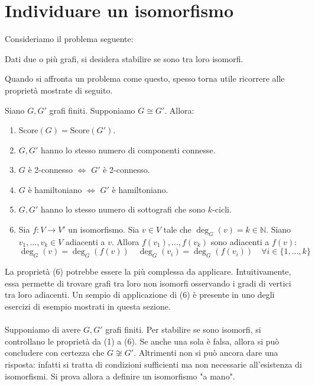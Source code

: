 

\section{Individuare un isomorfismo}
Consideriamo il problema seguente:
\begin{center}
Dati due o più grafi, si desidera stabilire se sono tra loro isomorfi.
\end{center}
Quando si affronta un problema come questo, spesso torna utile ricorrere
alle proprietà mostrate di seguito.
\begin{tcolorbox}[colback=red!30, colframe=red!30!black, title=Alcune caratteristiche dei grafi isomorfi]
Siano $G,G'$ grafi finiti. Supponiamo $G\cong G'$. Allora:
\begin{enumerate}
\item $\text{Score}(G)=\text{Score}(G')$.
\item $G,G'$ hanno lo stesso numero di componenti connesse.
\item $G$ è 2-connesso $\Longleftrightarrow$ $G'$ è 2-connesso.
\item $G$ è hamiltoniano $\Longleftrightarrow$ $G'$ è hamiltoniano.
\item $G,G'$ hanno lo stesso numero di sottografi che sono $k$-cicli.
\item Sia $f:V\to V'$ un isomorfismo. Sia $v\in V$ tale che $\deg_G(v)=k\in\mathbb{N}$.
Siano $v_1,...,v_k \in V$ adiacenti a $v$. Allora $f(v_1),...,f(v_k)$ sono
adiacenti a $f(v)$: \[\deg_G(v)=\deg_G(f(v)) \quad \deg_G(v_i)=\deg_G(f(v_i)) \quad \forall i \in\{1,...,k\}\]
\end{enumerate}
\end{tcolorbox}

La proprietà (6) potrebbe essere la più complessa da applicare. Intuitivamente,
essa permette di trovare grafi tra loro non isomorfi osservando i gradi
di vertici tra loro adiacenti. Un sempio di applicazione di (6) è presente
in uno degli esercizi di esempio mostrati in questa sezione.
\\\\
Supponiamo di avere $G,G'$ grafi finiti. Per stabilire se sono isomorfi, si
controllano le proprietà da (1) a (6). Se anche una sola è falsa, allora
si può concludere con certezza che $G\not\cong G'$. Altrimenti non si può
ancora dare una risposta: infatti si tratta di condizioni sufficienti ma
non necessarie all'esistenza di isomorfismi. Si prova allora a definire un
isomorfismo "a mano".

